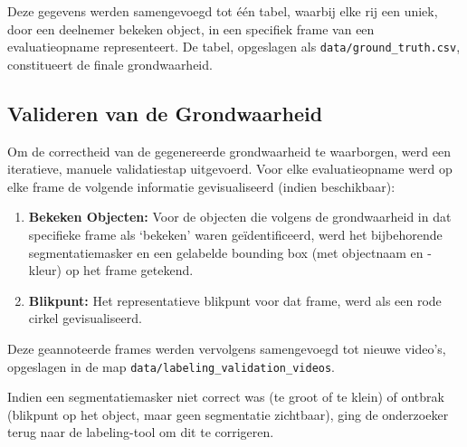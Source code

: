 Deze gegevens werden samengevoegd tot één tabel, waarbij elke rij een uniek, door een deelnemer bekeken object, 
in een specifiek frame van een evaluatieopname representeert. 
De tabel, opgeslagen als \texttt{data/ground\_truth.csv}, constitueert de finale grondwaarheid.

\subsection{Valideren van de Grondwaarheid}

Om de correctheid van de gegenereerde grondwaarheid te waarborgen, werd een iteratieve, manuele validatiestap uitgevoerd.
Voor elke evaluatieopname werd op elke frame de volgende informatie gevisualiseerd (indien beschikbaar):
\begin{enumerate}
  \item \textbf{Bekeken Objecten:} Voor de objecten die volgens de grondwaarheid in dat specifieke frame als `bekeken' 
  waren geïdentificeerd, werd het bijbehorende segmentatiemasker en een gelabelde bounding box (met objectnaam en -kleur) op het frame getekend.
  \item \textbf{Blikpunt:} Het representatieve blikpunt voor dat frame, werd als een rode cirkel gevisualiseerd.
\end{enumerate}
Deze geannoteerde frames werden vervolgens samengevoegd tot nieuwe video's, opgeslagen in de map \texttt{data/labeling\_validation\_videos}. 

Indien een segmentatiemasker niet correct was (te groot of te klein) of ontbrak (blikpunt op het object, maar geen segmentatie zichtbaar),
ging de onderzoeker terug naar de labeling-tool om dit te corrigeren.